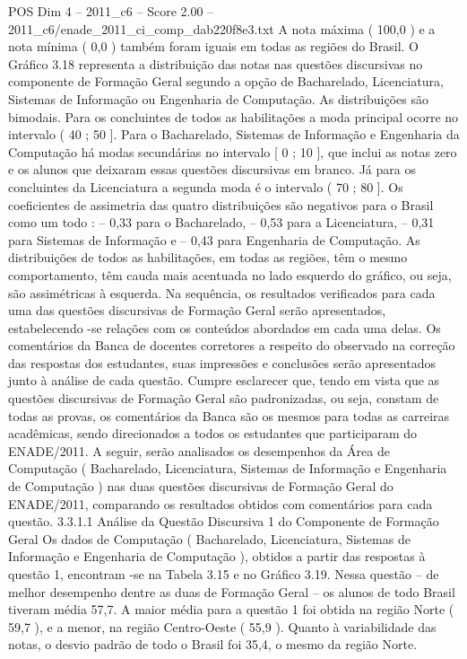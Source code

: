\begin{textsample}{POS Dim 4 – 2011\_c6 – Score 2.00 – 2011\_c6/enade\_2011\_ci\_comp\_dab220f8e3.txt}
A nota máxima ( 100,0 ) e a nota mínima ( 0,0 ) também foram iguais em todas as regiões do Brasil.
O Gráfico 3.18 representa a distribuição das notas nas questões discursivas no componente de Formação Geral segundo a opção de Bacharelado, Licenciatura, Sistemas de Informação ou Engenharia de Computação.
As distribuições são bimodais.
Para os concluintes de todos as habilitações a moda principal ocorre no intervalo ( 40 ; 50 ].
Para o Bacharelado, Sistemas de Informação e Engenharia da Computação há modas secundárias no intervalo [ 0 ; 10 ], que inclui as notas zero e os alunos que deixaram essas questões discursivas em branco.
Já para os concluintes da Licenciatura a segunda moda é o intervalo ( 70 ; 80 ].
Os coeficientes de assimetria das quatro distribuições são negativos para o Brasil como um todo : – 0,33 para o Bacharelado, – 0,53 para a Licenciatura, – 0,31 para Sistemas de Informação e – 0,43 para Engenharia de Computação.
As distribuições de todos as habilitações, em todas as regiões, têm o mesmo comportamento, têm cauda mais acentuada no lado esquerdo do gráfico, ou seja, são assimétricas à esquerda.
Na sequência, os resultados verificados para cada uma das questões discursivas de Formação Geral serão apresentados, estabelecendo -se relações com os conteúdos abordados em cada uma delas.
Os comentários da Banca de docentes corretores a respeito do observado na correção das respostas dos estudantes, suas impressões e conclusões serão apresentados junto à análise de cada questão.
Cumpre esclarecer que, tendo em vista que as questões discursivas de Formação Geral são padronizadas, ou seja, constam de todas as provas, os comentários da Banca são os mesmos para todas as carreiras acadêmicas, sendo direcionados a todos os estudantes que participaram do ENADE/2011.
A seguir, serão analisados os desempenhos da Área de Computação ( Bacharelado, Licenciatura, Sistemas de Informação e Engenharia de Computação ) nas duas questões discursivas de Formação Geral do ENADE/2011, comparando os resultados obtidos com comentários para cada questão. 3.3.1.1 Análise da Questão Discursiva 1 do Componente de Formação Geral Os dados de Computação ( Bacharelado, Licenciatura, Sistemas de Informação e Engenharia de Computação ), obtidos a partir das respostas à questão 1, encontram -se na Tabela 3.15 e no Gráfico 3.19.
Nessa questão – de melhor desempenho dentre as duas de Formação Geral – os alunos de todo Brasil tiveram média 57,7.
A maior média para a questão 1 foi obtida na região Norte ( 59,7 ), e a menor, na região Centro-Oeste ( 55,9 ).
Quanto à variabilidade das notas, o desvio padrão de todo o Brasil foi 35,4, o mesmo da região Norte.

\end{textsample}
